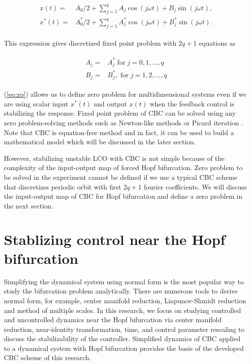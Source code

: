 \documentclass[openacc]{rsproca_new}%
\newcommand{\Eref}[1]{(\ref{#1})}
\begin{document}
\begin{align}\label{eq:dis}
  \begin{split}
  x(t)=&A_0/2+  \sum_{j=1}^{q} A_j \cos (j\omega t)+B_j \sin (j\omega t),\\
  x^*(t)=&A_0^*/2+  \sum_{j=1}^{q} A^*_j \cos (j\omega t)+B^*_j \sin (j\omega t).
\end{split}
\end{align}

\noindent This expression gives discretized fixed point problem with $2q+1$ equations as

\begin{align}\label{eq:zp}
  \begin{split}
  A_j=&A^*_j \; \textrm{for} \; j=0,1,\ldots,q\\
  B_j=&B^*_j,\; \textrm{for} \; j=1,2,\ldots,q
\end{split}
\end{align}

\noindent \Eref{eq:zp} allows us to define zero problem for multidimensional systems even if we are using scalar input $x^*(t)$ and output $x(t)$ when the feedback control is stabilizing the response. Fixed point problem of CBC can be solved using any zero problem-solving methods such as Newton-like methods \cite{schilder2015experimental} or Picard iteration \cite{barton2013systematic}. Note that CBC is equation-free method and in fact, it can be used to build a mathematical model which will be discussed in the later section.

However, stabilizing unstable LCO with CBC is not simple because of the complexity of the input-output map of forced Hopf bifurcation. Zero problem to be solved in the experiment cannot be defined if we use a typical CBC scheme that discretizes periodic orbit with first $2q+1$ fourier coefficients. We will discuss the input-output map of CBC for Hopf bifurcation and define a zero problem in the next section.

\section{Stablizing control near the Hopf bifurcation}\label{SNH}

Simplifying the dynamical system using normal form is the most popular way to study the bifurcation problem analytically. There are numerous tools to derive normal form, for example, center manifold reduction, Liapunov-Shmidt reduction and method of multiple scales. In this research, we focus on studying controlled and uncontrolled dynamics near the Hopf bifurcation via center manifold reduction, near-identity transformation, time, and control parameter rescaling to discuss the stabilizability of the controller. Simplified dynamics of CBC applied to a dynamical system with Hopf bifurcation provides the basis of the developed CBC scheme of this research.
\end{document}
